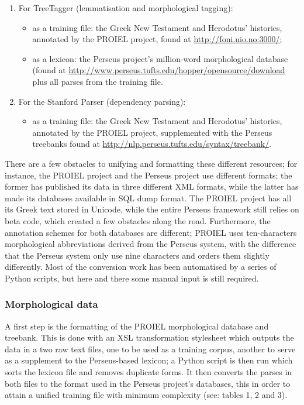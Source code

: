 \begin{enumerate}
  \item For TreeTagger (lemmatisation and morphological tagging):
\begin{itemize}
  \item as a training file: the Greek New Testament and Herodotus' histories, annotated by the PROIEL project, found at \url{http://foni.uio.no:3000/};
  \item as a lexicon: the Perseus project's million-word morphological database (found at \url{http://www.perseus.tufts.edu/hopper/opensource/download} plus all parses from the training file.
\end{itemize}

\item For the Stanford Parser (dependency parsing):
\begin{itemize}
  \item as a training file: the Greek New Testament and Herodotus' histories, annotated by the PROIEL project, supplemented with the Perseus treebanks found at \url{http://nlp.perseus.tufts.edu/syntax/treebank/}.
\end{itemize}
\end{enumerate}

There are a few obstacles to unifying and formatting these different
resources; for instance, the PROIEL project and the Perseus project use
different formats; the former has published its data in three different XML
formats, while the latter has made its databases available in SQL dump format.
The PROIEL project has all its Greek text stored in Unicode, while the entire
Perseus framework still relies on beta code, which created a few obstacles
along the road. Furthermore, the annotation schemes for both databases are
different; PROIEL uses ten-characters morphological abbreviations derived from
the Perseus system, with the difference that the Perseus system only use nine
characters and orders them slightly differently. Most of the conversion work
has been automatised by a series of Python scripts, but here and there some
manual input is still required. 


\subsubsection{Morphological data} %
\label{ssub:morphdata}

A first step is the formatting of the PROIEL morphological database and
treebank. This is done with an XSL transformation stylesheet which outputs the
data in a two raw text files, one to be used as a training corpus, another to
serve as a supplement to the Perseus-based lexicon; a Python script is then run
which sorts the lexicon file and removes duplicate forms. It then converts the
parses in both files to the format used in the Perseus project's databases,
this in order to attain a unified training file with minimum complexity (see:
tables 1, 2 and 3).


